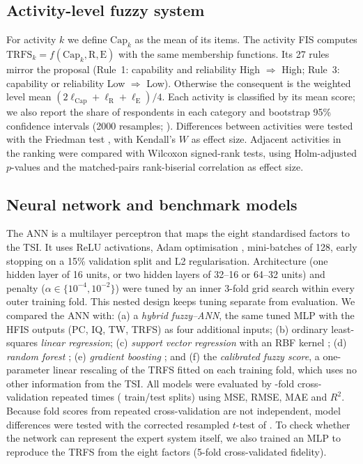 \documentclass[preprint,12pt,authoryear]{elsarticle}
\theoremstyle{remark}
\begin{document}
\subsection{Activity-level fuzzy system}
For activity $k$ we define $\mathrm{Cap}_k$ as the mean of its items. The activity FIS computes $\mathrm{TRFS}_k=f(\mathrm{Cap}_k,\mathrm{R},\mathrm{E})$ with the same membership functions. Its 27 rules mirror the proposal (Rule~1: capability and reliability High $\Rightarrow$ High; Rule~3: capability or reliability Low $\Rightarrow$ Low). Otherwise the consequent is the weighted level mean $(2\ell_{\mathrm{Cap}}+\ell_{\mathrm{R}}+\ell_{\mathrm{E}})/4$. Each activity is classified by its mean score; we also report the share of respondents in each category and bootstrap 95\% confidence intervals (2000 resamples; \citealp{efron1993}). Differences between activities were tested with the Friedman test \citep{friedman1937}, with Kendall's $W$ as effect size. Adjacent activities in the ranking were compared with Wilcoxon signed-rank tests, using Holm-adjusted $p$-values \citep{holm1979} and the matched-pairs rank-biserial correlation as effect size.

\subsection{Neural network and benchmark models}
The ANN is a multilayer perceptron \citep{rumelhart1986} that maps the eight standardised factors to the TSI. It uses ReLU activations, Adam optimisation \citep{kingma2015}, mini-batches of 128, early stopping on a 15\% validation split and L2 regularisation. Architecture (one hidden layer of 16 units, or two hidden layers of 32--16 or 64--32 units) and penalty ($\alpha\in\{10^{-4},10^{-2}\}$) were tuned by an inner 3-fold grid search within every outer training fold. This nested design keeps tuning separate from evaluation. We compared the ANN with:
(a) a \emph{hybrid fuzzy--ANN}, the same tuned MLP with the HFIS outputs (PC, IQ, TW, TRFS) as four additional inputs;
(b) ordinary least-squares \emph{linear regression};
(c) \emph{support vector regression} with an RBF kernel \citep{smola2004};
(d) \emph{random forest} \citep{breiman2001};
(e) \emph{gradient boosting} \citep{friedman2001}; and
(f) the \emph{calibrated fuzzy score}, a one-parameter linear rescaling of the TRFS fitted on each training fold, which uses no other information from the TSI.
All models were evaluated by \CVsplits-fold cross-validation repeated \CVrepeats{} times (\CVfits{} train/test splits) using MSE, RMSE, MAE and $R^2$. Because fold scores from repeated cross-validation are not independent, model differences were tested with the corrected resampled $t$-test of \citet{nadeau2003}. To check whether the network can represent the expert system itself, we also trained an MLP to reproduce the TRFS from the eight factors (5-fold cross-validated fidelity).
\end{document}
